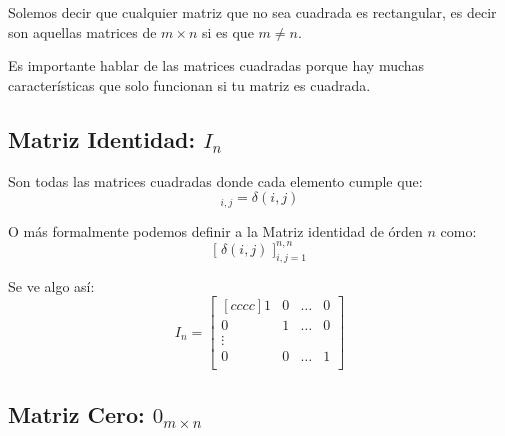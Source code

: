 \documentclass[12pt, fleqn]{report}                             %
\theoremstyle{break}                                            %
\newcommand{\BigBrackets}[1]    {\Big[ \; #1 \; \Big]}          %
\begin{document}
                Solemos decir que cualquier matriz que no sea cuadrada es
                rectangular, es decir son aquellas matrices de $m \times n$
                si es que $m \neq n$.

                Es importante hablar de las matrices cuadradas porque hay muchas
                características que solo funcionan si tu matriz es cuadrada.



            \clearpage
            \subsection{Matriz Identidad: $I_n$}

                Son todas las matrices cuadradas donde cada elemento cumple que:
                \begin{equation*}
                    [I]_{i, j} = \delta(i, j)
                \end{equation*}

                O más formalmente podemos definir a la Matriz identidad de órden $n$ como:
                \begin{equation*}
                    \BigBrackets{\delta(i,j)}_{i, j = 1}^{n, n}
                \end{equation*}

                Se ve algo así:
                \begin{equation*}
                    I_n =
                    \begin{bmatrix}[cccc]
                        1 & 0 & \dots & 0   \\
                        0 & 1 & \dots & 0   \\
                        \vdots              \\
                        0 & 0 & \dots & 1   \\
                    \end{bmatrix}
                \end{equation*}



            \vspace{2em}
            \subsection{Matriz Cero: $0_{m \times n}$}
\end{document}
